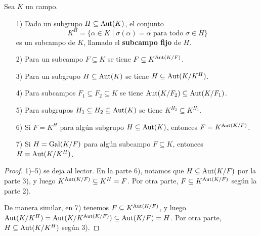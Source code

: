 \begin{proposicion}
\label{prop:subcampos-y-subgrupos-de-Aut}
  Sea $K$ un campo.

  \begin{enumerate}
  \item[1)] Dado un subgrupo $H \subseteq \operatorname{Aut} (K)$, el conjunto
    $$K^H = \{ \alpha \in K \mid \sigma (\alpha) = \alpha\text{ para todo }\sigma\in H \}$$
    es un subcampo de $K$, llamado el \textbf{subcampo fijo} de $H$.

  \item[2)] Para un subcampo $F\subseteq K$ se tiene
    $F \subseteq K^{\operatorname{Aut} (K/F)}$.

  \item[3)] Para un subgrupo $H \subseteq \operatorname{Aut} (K)$ se tiene
    $H \subseteq \operatorname{Aut} (K/K^H)$.

  \item[4)] Para subcampos $F_1 \subseteq F_2 \subseteq K$ se tiene
    $\operatorname{Aut} (K/F_2) \subseteq \operatorname{Aut} (K/F_1)$.

  \item[5)] Para subgrupos $H_1 \subseteq H_2 \subseteq \operatorname{Aut} (K)$ se tiene
    $K^{H_2} \subseteq K^{H_1}$.

  \item[6)] Si $F = K^H$ para algún subgrupo $H \subseteq \operatorname{Aut} (K)$, entonces
    $F = K^{\operatorname{Aut} (K/F)}$.
    
  \item[7)] Si $H = \operatorname{Gal} (K/F)$ para algún subcampo $F \subseteq K$, entonces
    $H = \operatorname{Aut} (K/K^H)$.
  \end{enumerate}

  \begin{proof}
    1)--5) se deja al lector. En la parte 6), notamos que
    $H \subseteq \operatorname{Aut} (K/F)$ por la parte 3), y luego
    $K^{\operatorname{Aut} (K/F)} \subseteq K^H = F$. Por otra parte,
    $F \subseteq K^{\operatorname{Aut} (K/F)}$ según la parte 2).

    De manera similar, en 7) tenemos $F \subseteq K^{\operatorname{Aut} (K/F)}$, y luego
    $\operatorname{Aut} (K/K^H) = \operatorname{Aut} (K/K^{\operatorname{Aut} (K/F)}) \subseteq \operatorname{Aut} (K/F) = H$.
    Por otra parte, $H \subseteq \operatorname{Aut} (K/K^H)$ según 3).
  \end{proof}
\end{proposicion}

